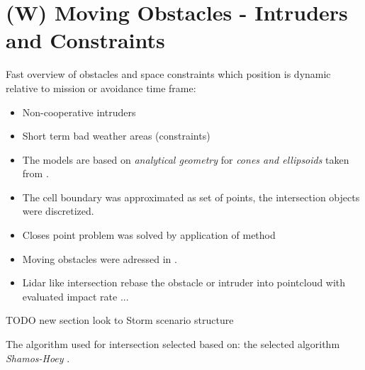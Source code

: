 \newpage
\section{(W) Moving Obstacles - Intruders and Constraints}\label{s:intruders}
    \noindent Fast overview of obstacles and space constraints which position is dynamic relative to mission or avoidance time frame:
    \begin{itemize}
        \item Non-cooperative intruders
        \item Short term bad weather areas (constraints)
        \item The models are based on \emph{analytical geometry} for \emph{cones and ellipsoids} taken from \cite{sommerville2016analytical}.
        \item The cell boundary was approximated as set of points, the intersection objects were discretized.
        \item Closes point problem \cite{shamos1975closest} was solved by application of method  \cite{bentley1980optimal}
		\item Moving obstacles were adressed in \cite{fiorini1998motion}.
		\item Lidar like intersection rebase the obstacle or intruder into pointcloud with evaluated impact rate ...
    \end{itemize}
    
TODO new section look to Storm scenario structure

The algorithm used for intersection selected based on:\citep{bentley1979algorithms} the selected algorithm  \emph{Shamos-Hoey} \cite{shamos1976geometric}.
